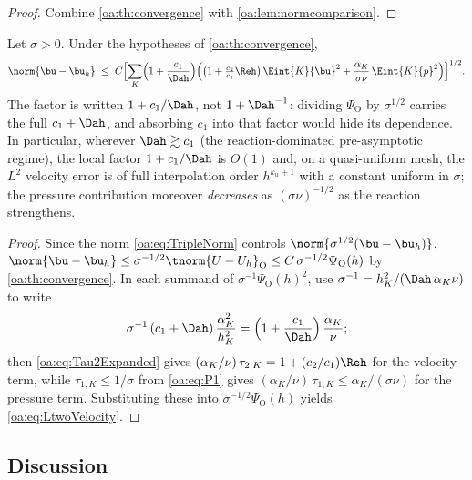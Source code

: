 \begin{proof}
Combine \cref{oa:th:convergence} with \cref{oa:lem:normcomparison}.
\end{proof}

\begin{corollary}
\label{oa:cor:Ltwo}
Let $\sigma > 0$. Under the hypotheses of \cref{oa:th:convergence},
\begin{equation}
  \label{oa:eq:LtwoVelocity}
  \norm{\bu - \bu_h}
  \;\le\;
  C \Bigl[ \sum_K \Bigl( 1 + \frac{c_1}{\Dah} \Bigr)
  \Bigl(
  \bigl( 1 + \tfrac{c_2}{c_1}\Reh \bigr)\, \Eint{K}{\bu}^2
  + \frac{\alpha_K}{\sigma\nu}\, \Eint{K}{p}^2
  \Bigr) \Bigr]^{1/2}.
\end{equation}
The factor is written $1+c_1/\Dah$, not $1+\Dah^{-1}$: dividing $\Psi_{\mathrm O}$ by
$\sigma^{1/2}$ carries the full $c_1+\Dah$, and absorbing $c_1$ into that factor would hide
its dependence. In particular, wherever $\Dah \gtrsim c_1$ (the reaction-dominated
pre-asymptotic regime), the local factor $1+c_1/\Dah$ is $O(1)$ and, on a quasi-uniform
mesh, the $L^2$ velocity error is of full interpolation order $h^{k_u+1}$ with a constant
uniform in $\sigma$; the pressure contribution moreover \emph{decreases} as
$(\sigma\nu)^{-1/2}$ as the reaction strengthens.
\end{corollary}

\begin{proof}
Since the norm \cref{oa:eq:TripleNorm} controls $\norm{\sigma^{1/2}(\bu-\bu_h)}$,
$\norm{\bu - \bu_h} \le \sigma^{-1/2}\tnorm{U - U_h}_{\mathrm{O}} \le
C\,\sigma^{-1/2}\Psi_{\mathrm O}(h)$ by \cref{oa:th:convergence}. In each summand of
$\sigma^{-1}\Psi_{\mathrm O}(h)^2$, use $\sigma^{-1} = h_K^2/(\Dah\,\alpha_K\nu)$ to write
\[
  \sigma^{-1}\,(c_1+\Dah)\,\frac{\alpha_K^2}{h_K^2}
  = \Bigl(1 + \frac{c_1}{\Dah}\Bigr)\,\frac{\alpha_K}{\nu};
\]
then \cref{oa:eq:Tau2Expanded} gives $(\alpha_K/\nu)\,\tau_{2,K} = 1 + (c_2/c_1)\Reh$ for the
velocity term, while $\tau_{1,K} \le 1/\sigma$ from \cref{oa:eq:P1} gives
$(\alpha_K/\nu)\,\tau_{1,K} \le \alpha_K/(\sigma\nu)$ for the pressure term. Substituting
these into $\sigma^{-1/2}\Psi_{\mathrm O}(h)$ yields \cref{oa:eq:LtwoVelocity}. \qedhere
\end{proof}

\subsection{Discussion}
\label{oa:sec:discussion}

